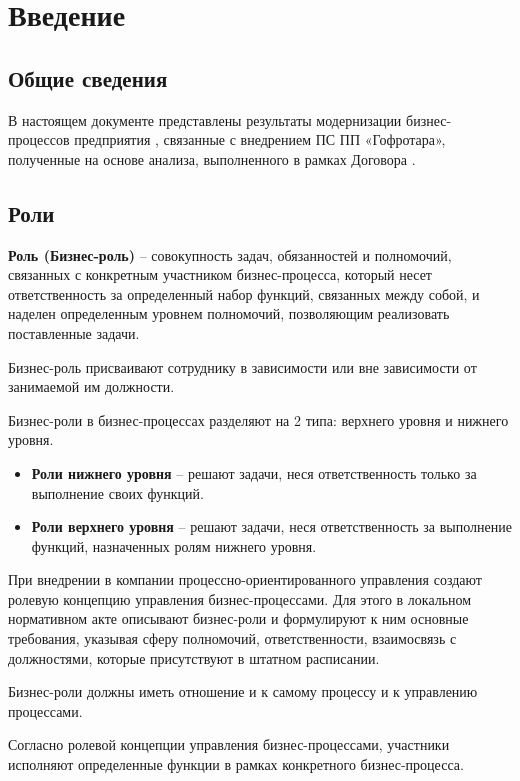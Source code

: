 \section{Введение}

\subsection{Общие сведения}

В настоящем документе представлены результаты модернизации бизнес-процессов предприятия \FIRMA, связанные с внедрением ПС ПП «Гофротара», полученные на основе анализа, выполненного в рамках Договора \agreement. 


\newpage
\subsection{Роли}

\textbf{Роль (Бизнес-роль)} – совокупность задач, обязанностей и полномочий, связанных с конкретным участником бизнес-процесса, который несет ответственность за определенный набор функций, связанных между собой, и наделен определенным уровнем полномочий, позволяющим реализовать поставленные задачи.

Бизнес-роль присваивают сотруднику в зависимости или вне зависимости от занимаемой им должности.  

Бизнес-роли в бизнес-процессах разделяют на 2 типа: верхнего уровня и нижнего уровня.

\begin{itemize}
\item{\textbf{Роли нижнего уровня} – решают задачи, неся ответственность только за  выполнение своих функций.}\
\item{\textbf{Роли верхнего уровня} – решают задачи, неся ответственность за выполнение функций, назначенных ролям нижнего уровня.} \
\end{itemize}

При внедрении в компании процессно-ориентированного управления создают ролевую концепцию управления бизнес-процессами. Для этого в локальном нормативном акте описывают бизнес-роли и формулируют к ним основные требования, указывая сферу полномочий, ответственности, взаимосвязь с должностями, которые присутствуют в штатном расписании. 

Бизнес-роли должны иметь отношение и к самому процессу и к управлению процессами. 

Согласно ролевой концепции управления бизнес-процессами, участники исполняют определенные функции в рамках конкретного бизнес-процесса.

